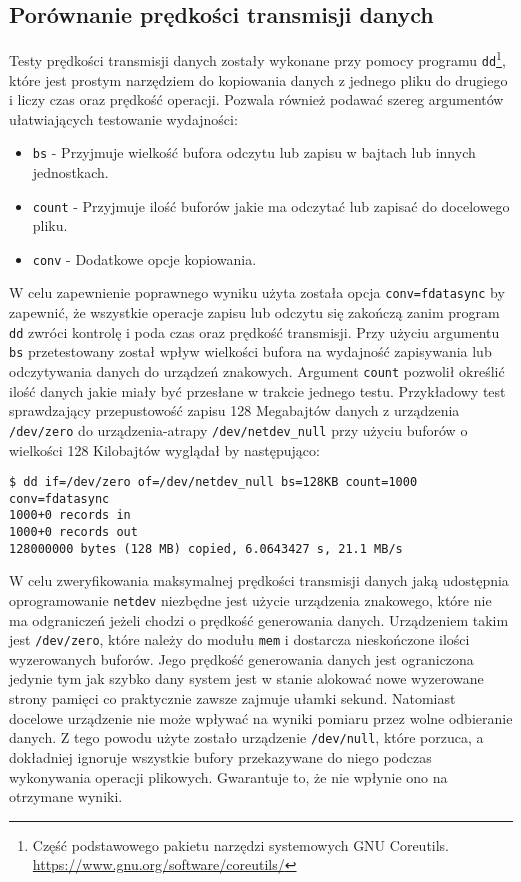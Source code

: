 \documentclass[10pt]{scrartcl}
\begin{document}
\subsection{Porównanie prędkości transmisji danych}

Testy prędkości transmisji danych zostały wykonane przy pomocy programu \texttt{dd}\footnote{Część podstawowego pakietu narzędzi systemowych GNU Coreutils. \url{https://www.gnu.org/software/coreutils/}}, które jest prostym narzędziem do kopiowania danych z jednego pliku do drugiego i liczy czas oraz prędkość operacji. Pozwala również podawać szereg argumentów ułatwiających testowanie wydajności:

\begin{itemize}
    \item \texttt{bs} - Przyjmuje wielkość bufora odczytu lub zapisu w bajtach lub innych jednostkach.
    \item \texttt{count} - Przyjmuje ilość buforów jakie ma odczytać lub zapisać do docelowego pliku.
    \item \texttt{conv} - Dodatkowe opcje kopiowania.
\end{itemize}

W celu zapewnienie poprawnego wyniku użyta została opcja \texttt{conv=fdatasync} by zapewnić, że wszystkie operacje zapisu lub odczytu się zakończą zanim program \texttt{dd} zwróci kontrolę i poda czas oraz prędkość transmisji. Przy użyciu argumentu \texttt{bs} przetestowany został wpływ wielkości bufora na wydajność zapisywania lub odczytywania danych do urządzeń znakowych. Argument \texttt{count} pozwolił określić ilość danych jakie miały być przesłane w trakcie jednego testu. Przykładowy test sprawdzający przepustowość zapisu 128 Megabajtów danych z urządzenia \texttt{/dev/zero} do urządzenia-atrapy \texttt{/dev/netdev\_null} przy użyciu buforów o wielkości 128 Kilobajtów wyglądał by następująco:

\begin{verbatim}
$ dd if=/dev/zero of=/dev/netdev_null bs=128KB count=1000 conv=fdatasync
1000+0 records in
1000+0 records out
128000000 bytes (128 MB) copied, 6.0643427 s, 21.1 MB/s
\end{verbatim}

W celu zweryfikowania maksymalnej prędkości transmisji danych jaką udostępnia oprogramowanie \texttt{netdev} niezbędne jest użycie urządzenia znakowego, które nie ma odgraniczeń jeżeli chodzi o prędkość generowania danych. Urządzeniem takim jest \texttt{/dev/zero}, które należy do modułu \texttt{mem} i dostarcza nieskończone ilości wyzerowanych buforów. Jego prędkość generowania danych jest ograniczona jedynie tym jak szybko dany system jest w stanie alokować nowe wyzerowane strony pamięci co praktycznie zawsze zajmuje ułamki sekund. Natomiast docelowe urządzenie nie może wpływać na wyniki pomiaru przez wolne odbieranie danych. Z tego powodu użyte zostało urządzenie \texttt{/dev/null}, które porzuca, a dokładniej ignoruje wszystkie bufory przekazywane do niego podczas wykonywania operacji plikowych. Gwarantuje to, że nie wpłynie ono na otrzymane wyniki.
\end{document}
